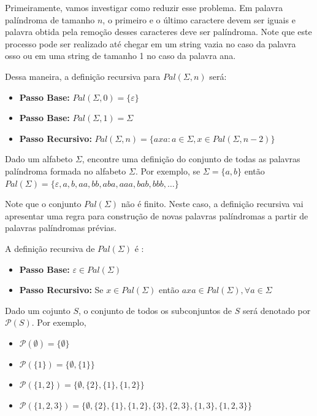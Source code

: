 Primeiramente, vamos investigar como reduzir esse problema. Em palavra palíndroma de tamanho $n$, o primeiro e o último caractere devem ser iguais e palavra obtida pela remoção desses caracteres deve ser palíndroma. Note que este processo pode ser realizado até chegar em um string vazia no caso da palavra osso ou em uma string de tamanho 1 no caso da palavra ana.


 Dessa maneira, a definição recursiva para $Pal(\Sigma, n)$ será:

\begin{itemize}
    \item \textbf{Passo Base:} $Pal(\Sigma,0) = \{ \varepsilon\}$
    
    \item \textbf{Passo Base:} $Pal(\Sigma,1) = \Sigma $
    
    \item \textbf{Passo Recursivo:} $Pal(\Sigma,n) = \{ axa : a \in \Sigma, x \in Pal(\Sigma,n-2)\}$
\end{itemize}


\begin{exemplo}
Dado um alfabeto $\Sigma$, encontre uma definição do conjunto de todas as palavras palíndroma formada no alfabeto $\Sigma$. Por exemplo, se $\Sigma = \{a,b\}$ então $Pal(\Sigma) = \{ \varepsilon, a, b, aa, bb, aba, aaa, bab, bbb, \ldots\}$
\end{exemplo}
 
Note que o conjunto $Pal(\Sigma)$ não é finito. Neste caso, a definição recursiva vai apresentar uma regra para construção de novas palavras palíndromas a partir de palavras palíndromas prévias.

A definição recursiva de $Pal(\Sigma)$ é :

\begin{itemize}
    \item \textbf{Passo Base:} $\varepsilon \in Pal(\Sigma)$
    
    \item \textbf{Passo Recursivo:} Se $x \in Pal(\Sigma)$ então $axa \in Pal(\Sigma), \forall a \in \Sigma$ 
\end{itemize}



\begin{exemplo}
Dado um cojunto $S$, o conjunto de todos os subconjuntos de $S$ será denotado por $\mathcal{P}(S)$. Por exemplo,

\begin{itemize}
    \item $\mathcal{P}(\emptyset) = \{\emptyset \}$
    \item $\mathcal{P}(\{1\}) = \{\emptyset , \{1\}\}$
    \item $\mathcal{P}(\{1,2\}) = \{\emptyset,\{2\},\{1\}, \{1,2\}\}$
    \item $\mathcal{P}(\{1,2,3\}) = \{\emptyset,\{2\},\{1\}, \{1,2\},\{3\},\{2,3\},\{1,3\},\{1,2,3\}\}$
    
\end{itemize}

\end{exemplo}

